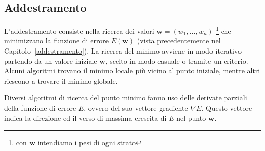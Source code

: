 \documentclass[11pt,a4paper,twoside,
openright]{book}
\begin{document}
\subsection{Addestramento}
L'addestramento consiste nella ricerca dei valori $\textbf{w}=(w_1,\dots,w_n)$ \footnote{con $\textbf{w}$ intendiamo i pesi di ogni strato} che minimizzano la funzione di errore $E(\textbf{w})$ (vista precedentemente nel Capitolo~\ref{addestramento}).
La ricerca del minimo avviene in modo iterativo partendo da un valore iniziale $\textbf{w}$, scelto in modo casuale o tramite un criterio. Alcuni algoritmi trovano il minimo locale più vicino al punto iniziale, mentre altri riescono a trovare il minimo globale.

Diversi algoritmi di ricerca del punto minimo fanno uso delle derivate parziali della funzione di errore $E$, ovvero del suo vettore gradiente $\nabla E$. Questo vettore indica la direzione ed il verso di massima crescita di $E$ nel punto $\textbf{w}$.
\end{document}
